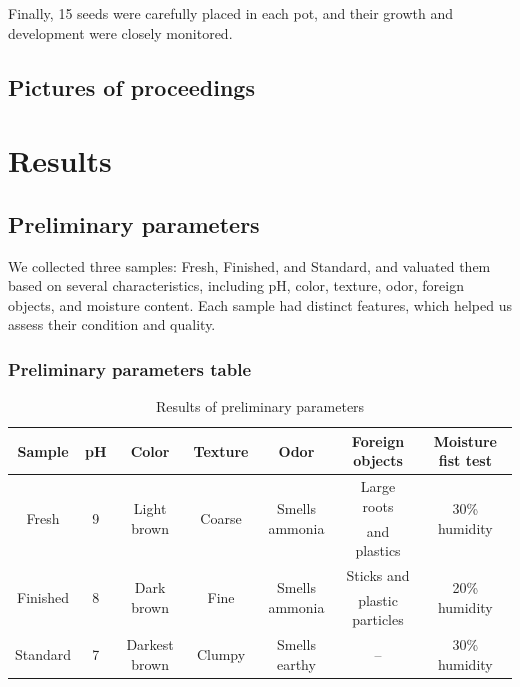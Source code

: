 \documentclass{article}
\begin{document}
Finally, 15 seeds were carefully placed in each pot, and their growth and development
were closely monitored.

\subsection{Pictures of proceedings}

\newpage
\section{Results}
\subsection{Preliminary parameters}
We collected three samples: Fresh, Finished, and Standard, and 
valuated them based on several characteristics, including pH, color,
texture, odor, foreign objects, and moisture content. Each sample had
distinct features, which helped us assess their condition and quality. 

\subsubsection{Preliminary parameters table}
\renewcommand{\arraystretch}{1.5}
\begin{table}[ht!]
    \centering \vspace{.3cm}
    \caption{Results of preliminary parameters}
    \hspace*{-.3cm}
    \begin{tabular}{|c|c|c|c|c|c|c|}
        \hline
        \textbf{Sample} & \textbf{pH} & \textbf{Color} & \textbf{Texture} & \textbf{Odor} & \textbf{Foreign objects} & \textbf{Moisture fist test}\\
        \hline
        \multirow{2}{*}{Fresh} & \multirow{2}{*}{9} & \multirow{2}{*}{Light brown} & \multirow{2}{*}{Coarse} & \multirow{2}{*}{Smells ammonia} & Large roots & \multirow{2}{*}{30\% humidity} \\
        & & & & & and plastics & \\
        \hline                                                                  
        \multirow{2}{*}{Finished} & \multirow{2}{*}{8} & \multirow{2}{*}{Dark brown} & \multirow{2}{*}{Fine} & \multirow{2}{*}{Smells ammonia} & Sticks and & \multirow{2}{*}{20\% humidity} \\
        & & & & & plastic particles & \\
        \hline
        Standard & 7 & Darkest brown & Clumpy & Smells earthy & -- & 30\% humidity\\
        \hline
    \end{tabular}
\end{table}
\phantom{} \vspace*{-.2cm}
\end{document}
